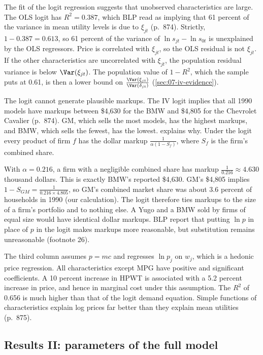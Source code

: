 The fit of the logit regression suggests that unobserved characteristics are large. The OLS logit has
$R^2=0.387$, which BLP read as implying that 61 percent of the variance in mean utility levels is due to $\xi_{jt}$
(p.~874). Strictly, $1-0.387=0.613$, so 61 percent of the variance of $\ln s_{jt}-\ln s_{0t}$ is unexplained by the OLS
regressors. Price is correlated with $\xi_{jt}$, so the OLS residual is not $\xi_{jt}$. If the other characteristics are
uncorrelated with $\xi_{jt}$, the population residual variance is below $\Var(\xi_{jt})$. The population value of
$1-R^2$, which the sample puts at 0.61, is then a lower bound on $\frac{\Var(\xi_{jt})}{\Var(\delta_{jt})}$
(\cref{sec:07-iv-evidence}).

The logit cannot generate plausible markups. The IV logit implies that all 1990 models have markups
between \$4,630 for the BMW and \$4,805 for the Chevrolet Cavalier (p.~874). GM, which sells the most
models, has the highest markups, and BMW, which sells the fewest, has the lowest.
 explains why. Under the logit every product of firm $f$ has the dollar markup
$\frac{1}{\alpha(1-S_f)}$, where $S_f$ is the firm's combined share.

With $\alpha=0.216$, a firm with a negligible combined share has markup $\frac{1}{0.216}\approx4.630$
thousand dollars. This is exactly BMW's reported \$4,630. GM's \$4,805 implies
$1-S_{GM}=\frac{1}{0.216\times4.805}$, so GM's combined market share was about $3.6$ percent of
households in 1990 (our calculation). The logit therefore ties markups to the size of a firm's portfolio and to nothing
else. A Yugo and a BMW sold by firms of equal size would have identical dollar markups. BLP report that
putting $\ln p$ in place of $p$ in the logit makes markups more reasonable, but substitution remains
unreasonable (footnote 26).

The third column assumes $p=mc$ and regresses $\ln p_j$ on $w_j$, which is a hedonic price regression.
All characteristics except MPG have positive and significant coefficients. A 10 percent increase in
HPWT is associated with a 5.2 percent increase in price, and hence in marginal cost under this
assumption. The $R^2$ of 0.656 is much higher than that of the logit demand equation. Simple functions
of characteristics explain log prices far better than they explain mean utilities (p.~875).

\subsection{Results II: parameters of the full model}\label{sec:08-blp95-params}

